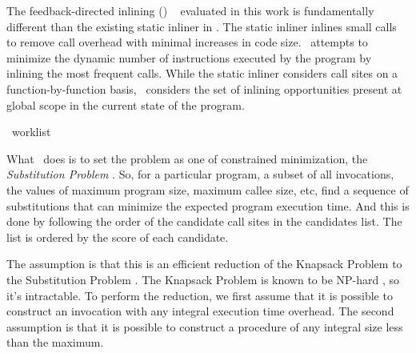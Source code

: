 
The feedback-directed inlining (\FDI) ~\cite{BerubePhD} evaluated in this work is
fundamentally different than the existing static inliner in \llvm.
The static inliner inlines small calls to remove call overhead with
minimal increases in code size.  \FDI\ attempts to minimize the
dynamic number of instructions executed by the program by inlining the
most frequent calls.  While the static inliner considers call sites on
a function-by-function basis, \FDI\ considers the set of inlining
opportunities present at global scope in the current state of the
program.

\begin{algorithm}[t!p]
\begin{small}
  
\end{small}
  \caption{\FDI\ worklist}
  \label{alg:fdiworklist}
\end{algorithm}

What \FDI\ does is to set the problem as one of constrained minimization,
the {\it Substitution Problem} \cite{Arnold00}. So, for a particular program, a subset of
all invocations, the values of maximum program size, maximum callee size,
etc, find a sequence of substitutions that can minimize the expected
program execution time. And this is done by following the order of the
candidate call sites in the candidates list. The list is ordered by the
score of each candidate.

The assumption is that this is an efficient reduction of the Knapsack
Problem to the Substitution Problem \cite{Arnold00,Scheifler1977}. The
Knapsack Problem is known to be NP-hard \cite{Garey1979}, so it's
intractable. To perform the reduction, we first assume that it is
possible to construct an invocation with any integral execution time
overhead. The second assumption is that it is possible to construct a
procedure of any integral size less than the maximum.

